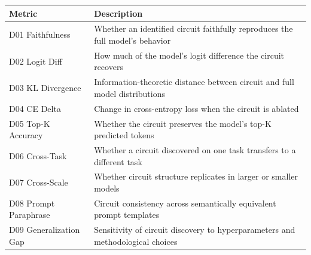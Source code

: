 \documentclass{article}
\begin{document}
\begin{minipage}{\linewidth}
\par
\begin{center}
\begin{tabular}{@{}lp{10cm}@{}}
\toprule
\textbf{Metric} & \textbf{Description} \\
\midrule
D01 Faithfulness & Whether an identified circuit faithfully reproduces the full model's behavior \\
\midrule
D02 Logit Diff & How much of the model's logit difference the circuit recovers \\
\midrule
D03 KL Divergence & Information-theoretic distance between circuit and full model distributions \\
\midrule
D04 CE Delta & Change in cross-entropy loss when the circuit is ablated \\
\midrule
D05 Top-K Accuracy & Whether the circuit preserves the model's top-K predicted tokens \\
\midrule
D06 Cross-Task & Whether a circuit discovered on one task transfers to a different task \\
\midrule
D07 Cross-Scale & Whether circuit structure replicates in larger or smaller models \\
\midrule
D08 Prompt Paraphrase & Circuit consistency across semantically equivalent prompt templates \\
\midrule
D09 Generalization Gap & Sensitivity of circuit discovery to hyperparameters and methodological choices \\
\bottomrule
\end{tabular}
\end{center}
\end{minipage}

\smallskip
\end{document}
